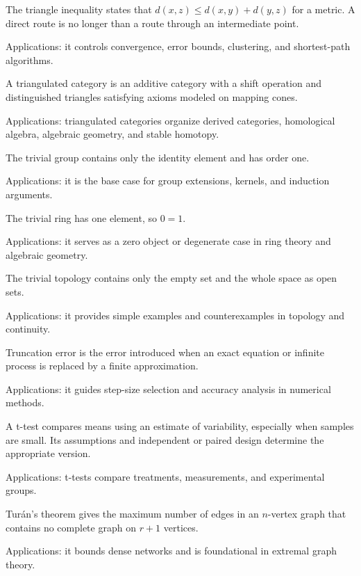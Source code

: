 The triangle inequality states that $d(x,z)\leq d(x,y)+d(y,z)$ for a metric. A direct route is no longer than a route through an intermediate point. \par\noindent Applications: it controls convergence, error bounds, clustering, and shortest-path algorithms.

A triangulated category is an additive category with a shift operation and distinguished triangles satisfying axioms modeled on mapping cones. \par\noindent Applications: triangulated categories organize derived categories, homological algebra, algebraic geometry, and stable homotopy.

The trivial group contains only the identity element and has order one. \par\noindent Applications: it is the base case for group extensions, kernels, and induction arguments.

The trivial ring has one element, so $0=1$. \par\noindent Applications: it serves as a zero object or degenerate case in ring theory and algebraic geometry.

The trivial topology contains only the empty set and the whole space as open sets. \par\noindent Applications: it provides simple examples and counterexamples in topology and continuity.

Truncation error is the error introduced when an exact equation or infinite process is replaced by a finite approximation. \par\noindent Applications: it guides step-size selection and accuracy analysis in numerical methods.

A t-test compares means using an estimate of variability, especially when samples are small. Its assumptions and independent or paired design determine the appropriate version. \par\noindent Applications: t-tests compare treatments, measurements, and experimental groups.

Turán's theorem gives the maximum number of edges in an $n$-vertex graph that contains no complete graph on $r+1$ vertices. \par\noindent Applications: it bounds dense networks and is foundational in extremal graph theory.

